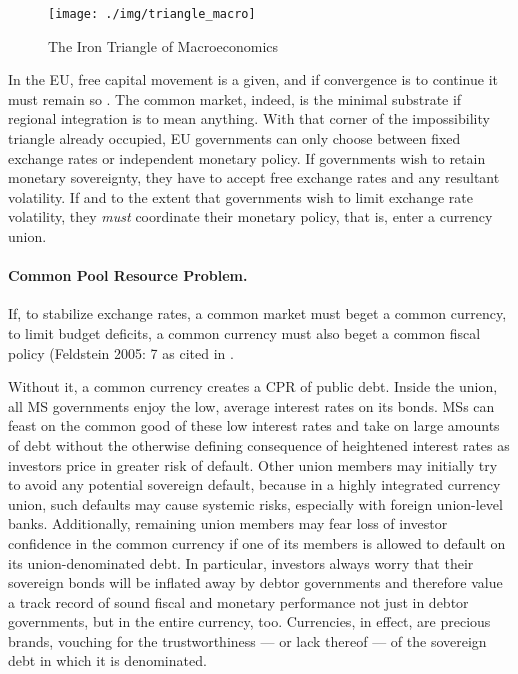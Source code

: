 \documentclass[11pt,a4paper,oneside,openright]{article}
\begin{document}
 \begin{figure}[htbp]
	\centering
	\texttt{[image: ./img/triangle\_macro]}  
	\caption{The Iron Triangle of Macroeconomics}
	\label{fig:triangle_macro}
\end{figure} 

In the \gls{EU}, free capital movement is a given, and if convergence is to continue it must remain so \citep{Abiad2007}. 
The common market, indeed, is the minimal substrate if regional integration is to mean anything. 
With that corner of the impossibility triangle already occupied, \gls{EU} governments can only choose between fixed exchange rates or independent monetary policy. 
If governments wish to retain monetary sovereignty, they have to accept free exchange rates and any resultant volatility. 
If and to the extent that governments wish to limit exchange rate volatility, they \emph{must} coordinate their monetary policy, that is, enter a currency union.

\paragraph[Fiscal-CPR]{Common Pool Resource Problem.}  \label{sec:Fiscal-CPR} If, to stabilize exchange rates, a common market must beget a common currency, to limit budget deficits, a common currency must also beget a common fiscal policy (Feldstein 2005: 7 as cited in \citep[13]{Begg2008}. 

Without it, a common currency creates a \gls{CPR} of public debt. 
Inside the union, all \gls{MS} governments enjoy the low, average interest rates on its bonds. 
\glspl{MS} can feast on the common good of these low interest rates and take on large amounts of debt without the otherwise defining consequence of heightened interest rates as investors price in greater risk of default. %
Other union members may initially try to avoid any potential sovereign default, because in a highly integrated currency union, such defaults may cause systemic risks, especially with foreign union-level banks. 
Additionally, remaining union members may fear loss of investor confidence in the common currency if one of its members is allowed to default on its union-denominated debt. 
In particular, investors always worry that their sovereign bonds will be inflated away by debtor governments and therefore value a track record of sound fiscal and monetary performance not just in debtor governments, but in the entire currency, too. 
Currencies, in effect, are precious brands, vouching for the trustworthiness --- or lack thereof --- of the sovereign debt in which it is denominated.
\end{document}
